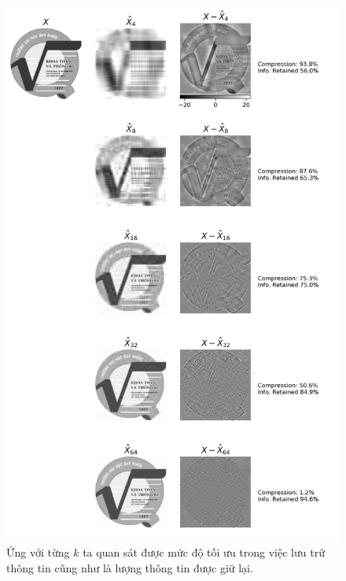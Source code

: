 \documentclass[12pt,a4paper,oneside]{report}
\numberwithin{equation}{section}
\begin{document}
\begin{figure}[htp]
	\centering
	\includegraphics[scale=0.7]{svd_qnu.png}
	\caption{Ứng với từng $k$ ta quan sát được mức độ tối ưu trong việc lưu trữ thông tin cũng như là lượng thông tin được giữ lại.}
	\label{fig:svd_qnu}
\end{figure}
\newpage
\end{document}
